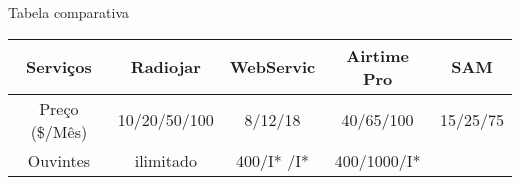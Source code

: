 \begin{frame}{Tabela comparativa}

\begin{longtable}[]{@{}ccccc@{}}
\toprule
\begin{minipage}[b]{0.20\columnwidth}\centering\strut
Serviços\strut
\end{minipage} & \begin{minipage}[b]{0.18\columnwidth}\centering\strut
Radiojar\strut
\end{minipage} & \begin{minipage}[b]{0.14\columnwidth}\centering\strut
WebServic\strut
\end{minipage} & \begin{minipage}[b]{0.17\columnwidth}\centering\strut
Airtime Pro\strut
\end{minipage} & \begin{minipage}[b]{0.17\columnwidth}\centering\strut
SAM\strut
\end{minipage}\tabularnewline
\midrule
\endhead
\begin{minipage}[t]{0.20\columnwidth}\centering\strut
Preço (\$/Mês)\strut
\end{minipage} & \begin{minipage}[t]{0.18\columnwidth}\centering\strut
10/20/50/100\strut
\end{minipage} & \begin{minipage}[t]{0.14\columnwidth}\centering\strut
8/12/18\strut
\end{minipage} & \begin{minipage}[t]{0.17\columnwidth}\centering\strut
40/65/100\strut
\end{minipage} & \begin{minipage}[t]{0.17\columnwidth}\centering\strut
15/25/75\strut
\end{minipage}\tabularnewline
\begin{minipage}[t]{0.20\columnwidth}\centering\strut
Ouvintes\strut
\end{minipage} & \begin{minipage}[t]{0.18\columnwidth}\centering\strut
ilimitado\strut
\end{minipage} & \begin{minipage}[t]{0.14\columnwidth}\centering\strut
400/I* /I*\strut
\end{minipage} & \begin{minipage}[t]{0.17\columnwidth}\centering\strut
400/1000/I*\strut
\end{minipage} & \begin{minipage}[t]{0.17\columnwidth}\centering\strut

\end{minipage}
\end{longtable}
\end{frame}
